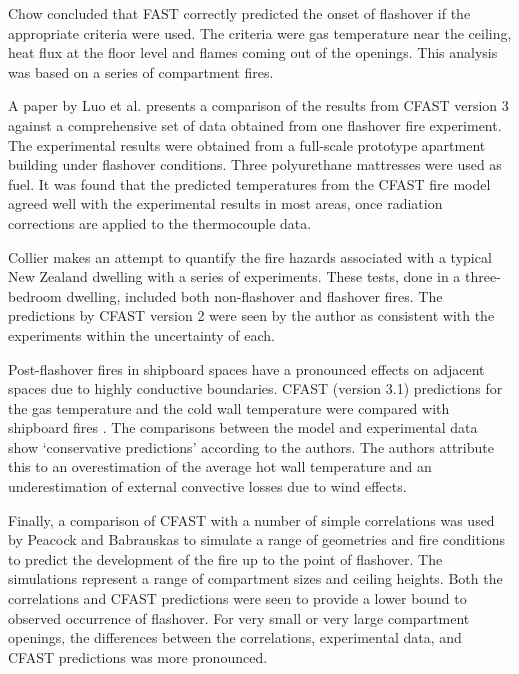 Chow \cite{Valid:Chow_Flashover} concluded that FAST correctly predicted the onset of flashover if the appropriate criteria were used. The criteria were gas temperature near the ceiling, heat flux at the floor level and flames coming out of the openings. This analysis was based on a series of compartment
fires.

A paper by Luo et al. \cite{Valid:Luo_Flashover} presents a comparison of the results from CFAST version 3 against a comprehensive set of data obtained from one flashover fire experiment. The experimental results were obtained from a full-scale prototype apartment building under flashover conditions. Three polyurethane mattresses were used as fuel. It was found that the predicted temperatures from the CFAST fire model agreed well with the experimental results in most areas, once radiation corrections are applied to the thermocouple data.

Collier \cite{Valid:Collier} makes an attempt to quantify the fire hazards associated with a typical New
Zealand dwelling with a series of experiments. These tests, done in a three-bedroom dwelling,
included both non-flashover and flashover fires. The predictions by CFAST version 2 were seen by the author as consistent with the experiments within the uncertainty of each.

Post-flashover fires in shipboard spaces have a pronounced effects on adjacent spaces due to
highly conductive boundaries. CFAST (version 3.1) predictions for the gas temperature and the
cold wall temperature were compared with shipboard fires \cite{Valid:White}. The comparisons between the model and experimental data show `conservative predictions' according to the authors. The authors attribute this to an overestimation of the average hot wall temperature and an underestimation of external convective losses due to wind effects.

Finally, a comparison of CFAST with a number of simple correlations was used by
Peacock and Babrauskas \cite{Valid:Peacock_Flashover_1,Valid:Peacock_Flashover_2} to simulate a range of geometries and fire conditions to predict the development of the fire up to the point of flashover. The simulations represent a range of compartment sizes and ceiling heights. Both the correlations and CFAST predictions were seen to provide a lower bound to observed occurrence of flashover. For very small or very large compartment openings, the differences between the correlations, experimental data, and CFAST predictions was more pronounced.

